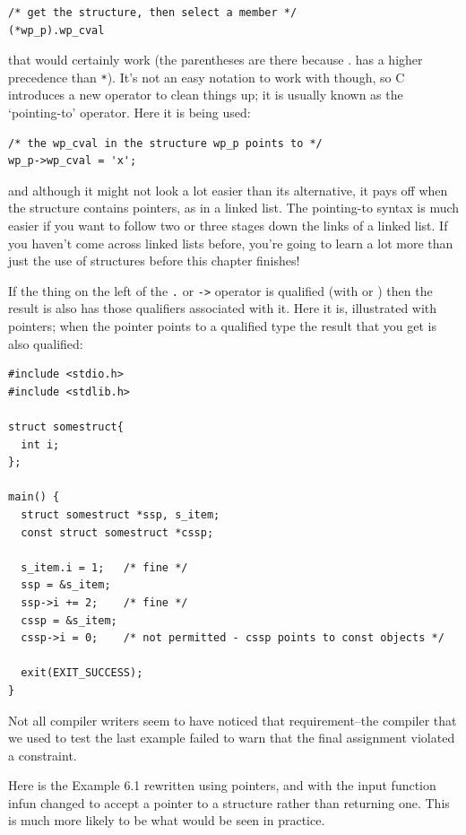    \begin{Verbatim}
/* get the structure, then select a member */
(*wp_p).wp_cval
\end{Verbatim}

   that would certainly work (the parentheses are there because . has
    a higher precedence than \texttt{*}). It's not an easy notation to work
    with though, so C introduces a new operator to clean things up; it is
    usually known as the `pointing-to' operator. Here it is being
    used:


   \begin{Verbatim}
/* the wp_cval in the structure wp_p points to */
wp_p->wp_cval = 'x';
\end{Verbatim}

   and although it might not look a lot easier than its alternative, it pays
    off when the structure contains pointers, as in a linked list. The
    pointing-to syntax is much easier if you want to follow two or three stages
    down the links of a linked list. If you haven't come across linked lists
    before, you're going to learn a lot more than just the use of structures
    before this chapter finishes!


   If the thing on the left of the \texttt{.} or \texttt{->}
    operator is qualified (with \const{} or \volatile{})
    then the result is also has those qualifiers associated with it. Here it
    is, illustrated with pointers; when the pointer points to a qualified type
    the result that you get is also qualified:


   \begin{Verbatim}
#include <stdio.h>
#include <stdlib.h>

struct somestruct{
  int i;
};

main() {
  struct somestruct *ssp, s_item;
  const struct somestruct *cssp;

  s_item.i = 1;   /* fine */
  ssp = &s_item;
  ssp->i += 2;    /* fine */
  cssp = &s_item;
  cssp->i = 0;    /* not permitted - cssp points to const objects */

  exit(EXIT_SUCCESS);
}
\end{Verbatim}

   Not all compiler writers seem to have noticed that requirement--the
    compiler that we used to test the last example failed to warn that the
    final assignment violated a constraint.


   Here is the Example 6.1 rewritten using pointers, and with
    the input function infun changed to accept a pointer to a structure rather
    than returning one. This is much more likely to be what would be seen in
    practice.


